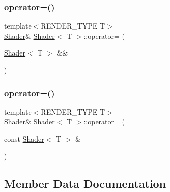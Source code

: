 \mbox{\label{classShader_a3b92fece66095389581a2bf6b3124657}} 
\subsubsection{\texorpdfstring{operator=()}{operator=()}\hspace{0.1cm}{\footnotesize\ttfamily [1/2]}}
{\footnotesize\ttfamily template$<$R\+E\+N\+D\+E\+R\+\_\+\+T\+Y\+PE T$>$ \\
\mbox{\hyperlink{classShader}{Shader}}\& \mbox{\hyperlink{classShader}{Shader}}$<$ T $>$\+::operator= (\begin{DoxyParamCaption}\item[{\mbox{\hyperlink{classShader}{Shader}}$<$ T $>$ \&\&}]{ }\end{DoxyParamCaption})\hspace{0.3cm}{\ttfamily [delete]}}

\mbox{\label{classShader_a58f724fecccecdb1633e08ce0258da37}} 
\subsubsection{\texorpdfstring{operator=()}{operator=()}\hspace{0.1cm}{\footnotesize\ttfamily [2/2]}}
{\footnotesize\ttfamily template$<$R\+E\+N\+D\+E\+R\+\_\+\+T\+Y\+PE T$>$ \\
\mbox{\hyperlink{classShader}{Shader}}\& \mbox{\hyperlink{classShader}{Shader}}$<$ T $>$\+::operator= (\begin{DoxyParamCaption}\item[{const \mbox{\hyperlink{classShader}{Shader}}$<$ T $>$ \&}]{ }\end{DoxyParamCaption})\hspace{0.3cm}{\ttfamily [delete]}}



\subsection{Member Data Documentation}
\mbox{\label{classShader_af8ec4edd2b1b56f32ce416280ff9b9e1}} 
